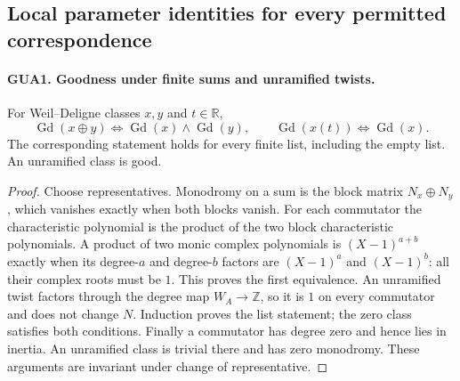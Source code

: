 \documentclass[11pt,a4paper]{article}
\numberwithin{equation}{section}
\theoremstyle{remark}\newtheorem{remark}[theorem]{Remark}
\begin{document}
\subsection{Local parameter identities for every permitted correspondence}

\paragraph{GUA1. Goodness under finite sums and unramified twists.}
\label{claim:GUA1}
For Weil--Deligne classes $x,y$ and $t\in\mathbb R$,
\[
 \operatorname{Gd}(x\oplus y)
       \Longleftrightarrow\operatorname{Gd}(x)\wedge\operatorname{Gd}(y),
 \qquad
 \operatorname{Gd}(x(t))\Longleftrightarrow\operatorname{Gd}(x).
\]
The corresponding statement holds for every finite list,
including the empty list.  An unramified class is good.
\begin{proof}
Choose representatives.  Monodromy on a sum is the block
matrix $N_x\oplus N_y$, which vanishes exactly when both
blocks vanish.  For each commutator the characteristic
polynomial is the product of the two block characteristic
polynomials.  A product of two monic complex polynomials is
$(X-1)^{a+b}$ exactly when its degree-$a$ and degree-$b$
factors are $(X-1)^a$ and $(X-1)^b$: all their complex roots
must be $1$.  This proves the first equivalence.  An
unramified twist factors through the degree map
$W_A\to\mathbb Z$, so it is $1$ on every commutator and
does not change $N$.  Induction proves the list statement;
the zero class satisfies both conditions.  Finally a
commutator has degree zero and hence lies in inertia.  An
unramified class is trivial there and has zero monodromy.
These arguments are invariant under change of representative.
\end{proof}

\end{document}
